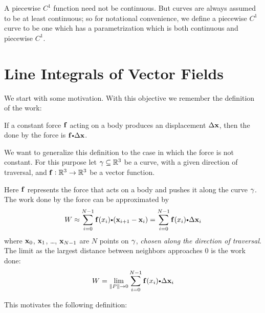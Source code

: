   \begin{remark}
    A piecewise $C^1$ function need not be continuous.
    But curves are always assumed to be at least continuous; so for notational convenience, we define a piecewise $C^1$ curve to be one which has a parametrization which is both continuous and piecewise $C^1$.
  \end{remark}
  
 


 
 
  \section{Line Integrals of Vector Fields}
  We start with some motivation.  With this objective we remember the definition of the work:

  \begin{definition}
    If a constant force $\mathbf{ f}$ acting on a body produces an  displacement $\Delta\mathbf{  x}$, then the  done by the force is $\funvect{f} \bp \Delta \vector{ x} $.
  \end{definition}
  
We want to generalize this definition to the case in which the force is not constant.  For this purpose let $\gamma \subseteq \mathbb{R}^3$ be a curve, with a given direction of traversal, and $\mathbf{ f}:\mathbb{R}^3 \to \mathbb{R}^3$ be a vector function.

  Here $\mathbf{ f}$ represents the force that acts on a body and pushes it along the curve $\gamma$.
  The work done by the force can be approximated by
  \begin{equation*}
    W \approx \sum_{i = 0}^{N-1} \funvect{f}( x_i ) \bp ( \vector{x}_{i+1} -  
\vector{x}_i ) =\sum_{i = 0}^{N-1} \funvect{f}( x_i ) \bp  \Delta\vector{x}_i
  \end{equation*}
  where $ \mathbf{ x}_0$, $ \mathbf{ x}_1$, \dots, $ \mathbf{ x}_{N-1}$ are $N$ 
points on $\gamma$, \emph{chosen along the direction of traversal}.
  The limit as the largest distance between neighbors approaches $0$  is the work done:
  \begin{equation*}
    W = \lim_{\norm{P} \to 0} \sum_{i = 0}^{N-1} \funvect{f}( x_i ) \bp  \Delta\vector{x}_i
  \end{equation*}
  

 This motivates the following definition:
  
